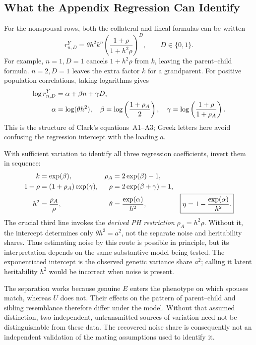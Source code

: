 \subsection{What the Appendix Regression Can Identify}
\label{sec:me-identification}

For the nonspousal rows, both the collateral and lineal formulas can
be written
\begin{equation}
 r^Y_{n,D}
 =\theta h^2 k^n
  \left(\frac{1+\rho}{1+h^2\rho}\right)^D,\qquad D\in\{0,1\}.
 \label{eq:me-regression-moment}
\end{equation}
For example, $n=1,D=1$ cancels $1+h^2\rho$ from $k$, leaving the
parent--child formula. $n=2,D=1$ leaves the extra factor $k$ for a
grandparent. For positive population correlations, taking logarithms gives
\begin{align}
 \log r^Y_{n,D}&=\alpha+\beta n+\gamma D,\notag\\
 \alpha&=\log(\theta h^2),\quad
 \beta=\log\left(\frac{1+\rho_A}{2}\right),\quad
 \gamma=\log\left(\frac{1+\rho}{1+\rho_A}\right).
 \label{eq:me-log-regression}
\end{align}
This is the structure of Clark's equations~A1--A3; Greek letters here
avoid confusing the regression intercept with the loading $a$.

With sufficient variation to identify all three regression coefficients,
invert them in sequence:
\begin{align}
 k&=\exp(\beta),&
 \rho_A&=2\exp(\beta)-1,\notag\\
 1+\rho&=(1+\rho_A)\exp(\gamma),&
 \rho&=2\exp(\beta+\gamma)-1,\notag\\
 h^2&=\frac{\rho_A}{\rho},&
 \theta&=\frac{\exp(\alpha)}{h^2},&
 \boxed{\eta=1-\frac{\exp(\alpha)}{h^2}.}
 \label{eq:me-inversion}
\end{align}
The crucial third line invokes the \emph{derived PH restriction}
$\rho_A=h^2\rho$. Without it, the intercept determines only
$\theta h^2=a^2$, not the separate noise and heritability shares.
Thus estimating noise by this route is possible in principle, but
its interpretation depends on the same substantive model being tested.
The exponentiated intercept is the observed genetic variance share $a^2$;
calling it latent heritability $h^2$ would be incorrect when noise is present.

The separation works because genuine $E$ enters the phenotype on which
spouses match, whereas $U$ does not. Their effects on the pattern of
parent--child and sibling resemblance therefore differ under the model.
Without that assumed distinction, two independent, untransmitted sources
of variation need not be distinguishable from these data. The recovered
noise share is consequently not an independent validation of the mating
assumptions used to identify it.


